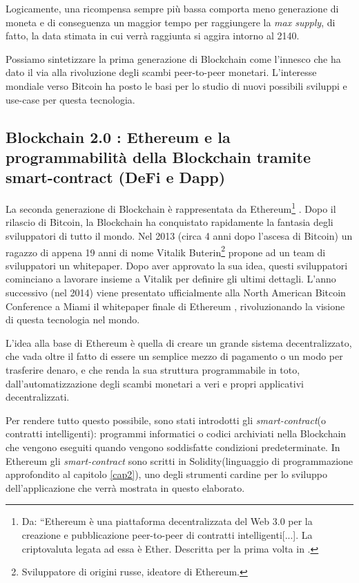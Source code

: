 Logicamente, una ricompensa sempre più bassa comporta meno generazione di moneta e di conseguenza un maggior tempo per raggiungere la \textit{max supply}, di fatto, la data stimata in cui verrà raggiunta si aggira intorno al 2140.

Possiamo sintetizzare la prima generazione di Blockchain come l'innesco che ha dato il via alla rivoluzione degli scambi peer-to-peer monetari. L'interesse mondiale verso Bitcoin ha posto le basi per lo studio di nuovi possibili sviluppi e use-case per questa tecnologia.
\subsection{ Blockchain 2.0 : Ethereum e la programmabilità della Blockchain tramite smart-contract (DeFi e Dapp)}\label{Blockchain2.0}
La seconda generazione di Blockchain è rappresentata da Ethereum\footnote{Da: \cite{ethereum_definizione} “Ethereum è una piattaforma decentralizzata del Web 3.0 per la creazione e pubblicazione peer-to-peer di contratti intelligenti[...]. La criptovaluta legata ad essa è Ether. Descritta per la prima volta in \cite{ethereum}.} \cite{ethereum}.
Dopo il rilascio di Bitcoin, la Blockchain ha conquistato rapidamente la fantasia degli sviluppatori di tutto il mondo. Nel 2013 (circa 4 anni dopo l'ascesa di Bitcoin) un ragazzo di appena 19 anni di nome Vitalik Buterin\footnote{Sviluppatore di origini russe, ideatore di Ethereum.} propone ad un team di sviluppatori un whitepaper. Dopo aver approvato la sua idea, questi sviluppatori cominciano a lavorare insieme a Vitalik per definire gli ultimi dettagli. L'anno successivo (nel 2014) viene presentato ufficialmente alla North American Bitcoin Conference a Miami il whitepaper finale di Ethereum \cite{ethereum}, rivoluzionando la visione di questa tecnologia nel mondo.

L'idea alla base di Ethereum è quella di creare un grande sistema decentralizzato, che vada oltre il fatto di essere un semplice mezzo di pagamento o un modo per trasferire denaro, e che renda la sua struttura programmabile in toto, dall'automatizzazione degli scambi monetari a veri e propri applicativi decentralizzati.

Per rendere tutto questo possibile, sono stati introdotti gli \textit{smart-contract}(o contratti intelligenti): programmi informatici o codici archiviati nella Blockchain che vengono eseguiti quando vengono soddisfatte condizioni predeterminate.
In Ethereum gli  \textit{smart-contract} sono scritti in Solidity(linguaggio di programmazione approfondito al capitolo \ref{cap2}), uno degli strumenti cardine per lo sviluppo dell'applicazione che verrà mostrata in questo elaborato. 

